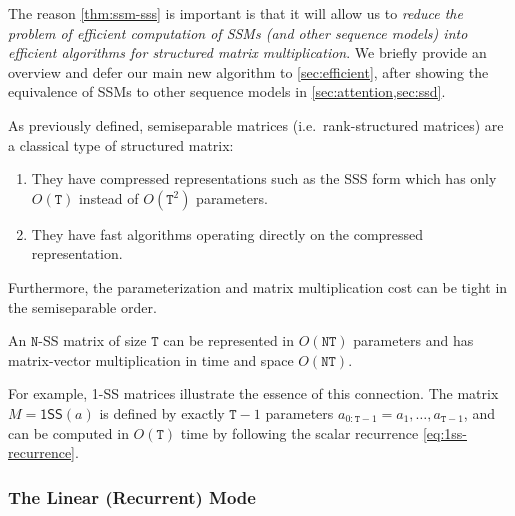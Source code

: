The reason \cref{thm:ssm-sss} is important is that it will allow us to \emph{reduce the problem of efficient computation of SSMs (and other sequence models) into efficient algorithms for structured matrix multiplication}.
We briefly provide an overview and defer our main new algorithm to \cref{sec:efficient}, after showing the equivalence of SSMs to other sequence models in
\cref{sec:attention,sec:ssd}.

As previously defined, semiseparable matrices (i.e.\ rank-structured matrices) are a classical type of structured matrix:
\begin{enumerate}[label=(\roman*)]
  \item They have compressed representations such as the SSS form which has only $O(\mathtt{T})$ instead of $O(\mathtt{T}^2)$ parameters.
  \item They have fast algorithms operating directly on the compressed representation.
\end{enumerate}
Furthermore, the parameterization and matrix multiplication cost can be tight in the semiseparable order.
\begin{proposition}
  \label{prop:ss-mvm}
  An $\mathtt{N}$-SS matrix of size $\mathtt{T}$ can be represented in $O(\mathtt{NT})$ parameters and has matrix-vector multiplication in time and space $O(\mathtt{NT})$.
\end{proposition}

For example, 1-SS matrices illustrate the essence of this connection.
The matrix $M = \mathsf{1SS}(a)$ is defined by exactly $\mathtt{T}-1$ parameters $a_{0:\mathtt{T}-1} = a_1, \dots, a_{\mathtt{T}-1}$,
and can be computed in $O(\mathtt{T})$ time by following the scalar recurrence \eqref{eq:1ss-recurrence}.




\subsubsection{The Linear (Recurrent) Mode}
\label{sec:ssm:algorithms:linear}

